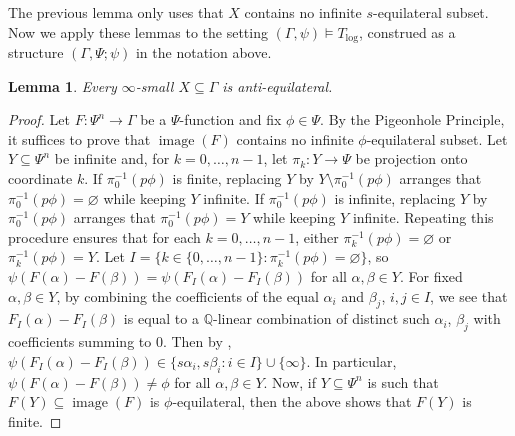 \documentclass[11pt]{amsart}
\theoremstyle{plain}
\newtheorem{lemma}[thm]{Lemma}
\theoremstyle{definition}
\numberwithin{equation}{section}
\newcommand\Q{\mathbb{Q}}
\newcommand\0{\varnothing}
\DeclareMathOperator\image{image}
\begin{document}
\noindent
The previous lemma only uses that $X$ contains no infinite $s$-equilateral subset.
Now we apply these lemmas to the setting $(\Gamma,\psi)\models T_{\log}$, construed as a structure $(\Gamma, \Psi; \psi)$ in the notation above.

\begin{lemma}
Every $\infty$-small $X \subseteq \Gamma$ is anti-equilateral. \end{lemma}
\begin{proof}
Let $F\colon \Psi^n \to \Gamma$ be a $\Psi$-function and fix $\phi\in\Psi$.
By the Pigeonhole Principle, it suffices to prove that $\image(F)$ contains no infinite $\phi$-equilateral subset. Let $Y \subseteq \Psi^n$ be infinite and, for $k=0,\dots,n-1$, let $\pi_k \colon Y \to \Psi$ be projection onto coordinate $k$.
If $\pi_0^{-1}(p\phi)$ is finite, replacing $Y$ by $Y \setminus \pi_0^{-1}(p\phi)$ arranges that $\pi_0^{-1}(p\phi)=\0$ while keeping $Y$ infinite.
If $\pi_0^{-1}(p\phi)$ is infinite, replacing $Y$ by $\pi_0^{-1}(p\phi)$ arranges that $\pi_0^{-1}(p\phi)=Y$ while keeping $Y$ infinite.
Repeating this procedure ensures that for each $k=0,\dots,n-1$, either $\pi_k^{-1}(p\phi)=\0$ or $\pi_k^{-1}(p\phi)=Y$.
Let $I=\{k\in\{0,\dots,n-1\} : \pi_k^{-1}(p\phi)=\0 \}$, so $\psi(F(\alpha)-F(\beta)) = \psi(F_I(\alpha)-F_I(\beta))$ for all $\alpha,\beta\in Y$.
For fixed $\alpha,\beta \in Y$, by combining the coefficients of the equal $\alpha_i$ and $\beta_j$, $i,j\in I$, we see that $F_I(\alpha)-F_I(\beta)$ is equal to a $\Q$-linear combination of distinct such $\alpha_i$, $\beta_j$ with coefficients summing to $0$.
Then by \cite[Lemma~6.4]{GehretACTlog}, $\psi(F_I(\alpha)-F_I(\beta))\in \{ s\alpha_i, s\beta_i : i \in I\}\cup\{\infty\}$.
In particular, $\psi(F(\alpha)-F(\beta))\neq\phi$ for all $\alpha,\beta \in Y$.
Now, if $Y\subseteq\Psi^n$ is such that $F(Y) \subseteq \image(F)$ is $\phi$-equilateral, then the above shows that $F(Y)$ is finite.
\end{proof}
\end{document}
